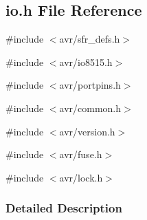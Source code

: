 \subsection{io.h File Reference}
\label{io_8h}
{\ttfamily \#include $<$avr/sfr\_\-defs.h$>$}\par
{\ttfamily \#include $<$avr/io8515.h$>$}\par
{\ttfamily \#include $<$avr/portpins.h$>$}\par
{\ttfamily \#include $<$avr/common.h$>$}\par
{\ttfamily \#include $<$avr/version.h$>$}\par
{\ttfamily \#include $<$avr/fuse.h$>$}\par
{\ttfamily \#include $<$avr/lock.h$>$}\par


\subsubsection{Detailed Description}
